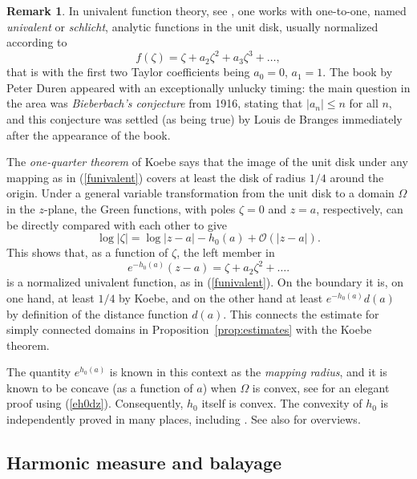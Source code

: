 \documentclass[reqno,12pt]{article}
\theoremstyle{plain}
\theoremstyle{definition}
\newtheorem{remark}[defn]{Remark}
\numberwithin{equation}{section}
\numberwithin{figure}{section}
\begin{document}
\begin{remark}
In {univalent function theory}, see \cite{Pommerenke-1975, Duren-1983}, 
one works with one-to-one, named {\it univalent} or {\it schlicht}, analytic functions in the unit disk, usually normalized according to
\begin{equation}\label{funivalent}
f(\zeta)=\zeta+a_2\zeta^2+a_3\zeta^3+\dots,
\end{equation}
that is with the first two Taylor coefficients being $a_0=0$, $a_1=1$. The book \cite{Duren-1983} by Peter Duren
appeared with an exceptionally unlucky timing: the main question in the area was {\it Bieberbach's conjecture} from 1916,
stating that $|a_n|\leq n$ for all $n$, and this conjecture was settled (as being true) by Louis de Branges 
\cite{deBranges-1985} immediately after the appearance  of the book.  

The {\it one-quarter theorem} of Koebe says that the image of the unit disk 
under any mapping as in (\ref{funivalent}) covers at least the disk of radius $1/4$ around the origin. 
Under a general variable transformation from the unit disk  to a domain $\Omega$ in the $z$-plane,
the Green functions, with poles $\zeta=0$ and $z=a$, respectively, can be directly compared with each other to give
$$
\log|\zeta|=\log |z-a|-h_0(a)+\mathcal{O} (|z-a|).
$$
This shows that, as a function of $\zeta$, the left member in 
$$
e^{-h_0(a)}(z-a)=\zeta +a_2\zeta^2+\dots .
$$
is a normalized univalent function, as in (\ref{funivalent}). 
On the boundary it is, on one hand, at least $1/4$ by Koebe,
and on the other hand at least $e^{-h_{0}(a)}d(a)$ by definition of the distance function $d(a)$.
This connects the estimate for simply connected domains in Proposition~\ref{prop:estimates}
with the Koebe theorem.

The quantity $e^{h_0(a)}$ is known in this context as the {\it mapping radius}, and it is known to
be concave (as a function of $a$) when $\Omega$ is convex, see \cite{Minda-Wright-1982}
for an elegant proof using (\ref{eh0dz}). 
Consequently, $h_0$ itself is convex. The convexity of $h_0$ is independently
proved in many places, including \cite{Caffarelli-Friedman-1985, Kawohl-1985, Gustafsson-1990a}. See also 
\cite{Bandle-Flucher-1998, Flucher-1999} for overviews.
\end{remark}


\subsection{Harmonic measure and balayage}\label{sec:balayage}
\end{document}
